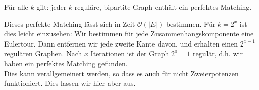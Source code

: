 \begin{satz}
    Für alle $k$ gilt: jeder $k$-reguläre, bipartite Graph enthält ein perfektes Matching.
\end{satz}
\bigskip

Dieses perfekte Matching lässt sich in Zeit $\mathcal{O}(|E|)$ bestimmen. Für $k=2^x$ ist dies leicht einzusehen: Wir bestimmen für
jede Zusammenhangskomponente eine Eulertour. Dann entfernen wir jede zweite Kante davon, und erhalten einen $2^{x-1}$ regulären Graphen.
Nach $x$ Iterationen ist der Graph $2^0 = 1$ regulär, d.h. wir haben ein perfektes Matching gefunden. \\

Dies kann verallgemeinert werden, so dass es auch für nicht Zweierpotenzen funktioniert. Dies lassen wir hier aber aus.
